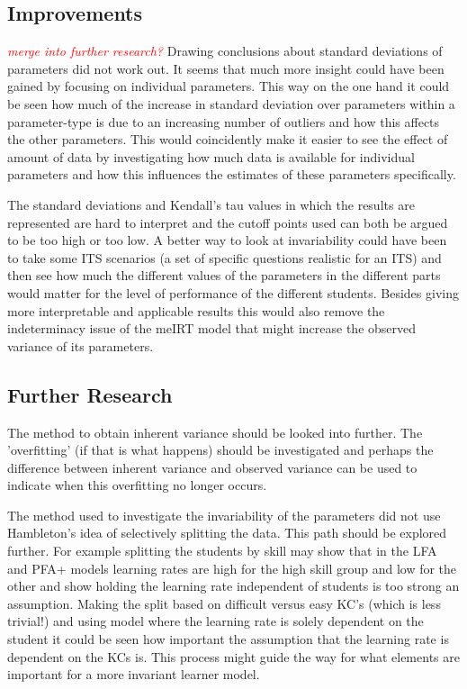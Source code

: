\documentclass{scrartcl}
\newcommand\todo[1]{\textit{\textcolor{red}{#1}}}
\begin{document}
\subsection{Improvements}
\todo{merge into further research?}
Drawing conclusions about standard deviations of parameters did not work out. It seems that much more insight could have been gained by focusing on individual parameters. This way on the one hand it could be seen how much of the increase in standard deviation over parameters within a parameter-type is due to an increasing number of outliers and how this affects the other parameters. This would coincidently make it easier to see the effect of amount of data by investigating how much data is available for individual parameters and how this influences the estimates of these parameters specifically.

The standard deviations and Kendall's tau values in which the results are represented are hard to interpret and the cutoff points used can both be argued to be too high or too low. A better way to look at invariability could have been to take some ITS scenarios (a set of specific questions realistic for an ITS) and then see how much the different values of the parameters in the different parts would matter for the level of performance of the different students. Besides giving more interpretable and applicable results this would also remove the indeterminacy issue of the meIRT model that might increase the observed variance of its parameters.

\subsection{Further Research}
The method to obtain inherent variance should be looked into further. The 'overfitting' (if that is what happens) should be investigated and perhaps the difference between inherent variance and observed variance can be used to indicate when this overfitting no longer occurs.

The method used to investigate the invariability of the parameters did not use Hambleton's idea of selectively splitting the data. This path should be explored further. For example splitting the students by skill may show that in the LFA and PFA+ models learning rates are high for the high skill group and low for the other and show holding the learning rate independent of students is too strong an assumption. Making the split based on difficult versus easy KC's (which is less trivial!) and using model where the learning rate is solely dependent on the student it could be seen how important the assumption that the learning rate is dependent on the KCs is. This process might guide the way for what elements are important for a more invariant learner model.
\end{document}

